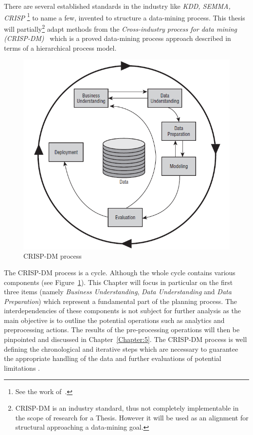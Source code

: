 There are several  established standards in the industry like \textit{KDD, SEMMA, CRISP} \footnote{See the work of~\cite{Azevedo;Santos;Filipe:2008}.} to name a few, invented to structure a data-mining process. This thesis will partially\footnote{CRISP-DM is an industry standard, thus not completely implementable in the scope of research for a Thesis. However it will be used as an alignment for structural approaching a data-mining goal.} adapt methods from the \textit{Cross-industry process for data mining (CRISP-DM)}~\cite{crisp} which is a proved data-mining process approach described in terms of a hierarchical process model.
\begin{figure}[h!]
    \centering
    \includegraphics[scale=0.5]{Graphics/crisp-dm.png}
    \caption{CRISP-DM process}
    \label{fig:crisp-dm}
\end{figure}

The CRISP-DM process is a cycle. Although the whole cycle contains various components (see Figure~\ref{fig:crisp-dm}). This Chapter will focus in particular on the first three items (namely \textit{Business Understanding}, \textit{Data Understanding} and \textit{Data Preparation}) which represent a fundamental part of the planning process. The interdependencies of these components is not subject for further analysis as the main objective is to outline the potential operations such as analytics and preprocessing actions. The results of the pre-processing operations will then be pinpointed and discussed in Chapter~\ref{Chapter:5}. The CRISP-DM process is well defining the chronological and iterative steps which are necessary to guarantee the appropriate handling of the data and further evaluations of potential limitations \cite{crisp}.  

